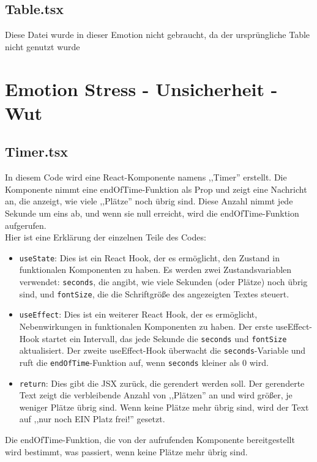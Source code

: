 \documentclass[./dokumentation.tex]{subfiles}
\begin{document}
\subsection{Table.tsx}
Diese Datei wurde in dieser Emotion nicht gebraucht, da der ursprüngliche Table nicht genutzt wurde 

\section{Emotion Stress - Unsicherheit - Wut}
\subsection{Timer.tsx}
In diesem Code wird eine React-Komponente namens ,,Timer'' erstellt. Die Komponente nimmt eine endOfTime-Funktion als Prop und zeigt eine Nachricht an, die anzeigt, wie viele ,,Plätze'' noch übrig sind. Diese Anzahl nimmt jede Sekunde um eins ab, und wenn sie null erreicht, wird die endOfTime-Funktion aufgerufen.\\

Hier ist eine Erklärung der einzelnen Teile des Codes:\\
\begin{itemize}
    \item \verb+useState+: Dies ist ein React Hook, der es ermöglicht, den Zustand in funktionalen Komponenten zu haben. Es werden zwei Zustandsvariablen verwendet: \verb+seconds+, die angibt, wie viele Sekunden (oder Plätze) noch übrig sind, und \verb+fontSize+, die die Schriftgröße des angezeigten Textes steuert.\\
    \item \verb+useEffect+: Dies ist ein weiterer React Hook, der es ermöglicht, Nebenwirkungen in funktionalen Komponenten zu haben. Der erste useEffect-Hook startet ein Intervall, das jede Sekunde die \verb+seconds+ und \verb+fontSize+ aktualisiert. Der zweite useEffect-Hook überwacht die \verb+seconds+-Variable und ruft die \verb+endOfTime+-Funktion auf, wenn \verb+seconds+ kleiner als 0 wird.\\
    \item \verb+return+: Dies gibt die JSX zurück, die gerendert werden soll. Der gerenderte Text zeigt die verbleibende Anzahl von ,,Plätzen'' an und wird größer, je weniger Plätze übrig sind. Wenn keine Plätze mehr übrig sind, wird der Text auf ,,nur noch EIN Platz frei!'' gesetzt.\\
\end{itemize}
Die endOfTime-Funktion, die von der aufrufenden Komponente bereitgestellt wird bestimmt, was passiert, wenn keine Plätze mehr übrig sind.
\end{document}
